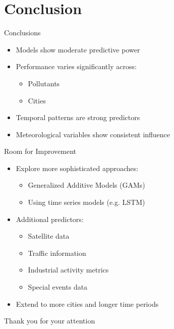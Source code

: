 \documentclass[svgnames, 10pt]{beamer}
\begin{document}
\section{Conclusion}

\begin{frame}{Conclusions}
\begin{itemize}
    \item Models show moderate predictive power
    \item Performance varies significantly across:
        \begin{itemize}
            \item Pollutants
            \item Cities
        \end{itemize}
    \item Temporal patterns are strong predictors
    \item Meteorological variables show consistent influence
\end{itemize}
\end{frame}

\begin{frame}{Room for Improvement}
\begin{itemize}
    \item Explore more sophisticated approaches:
        \begin{itemize}
            \item Generalized Additive Models (GAMs)
            \item Using time series models (e.g. LSTM)
        \end{itemize}
    \item Additional predictors:
        \begin{itemize}
            \item Satellite data
            \item Traffic information
            \item Industrial activity metrics
            \item Special events data
        \end{itemize}
    \item Extend to more cities and longer time periods
\end{itemize}
\end{frame}


\begin{frame}
\begin{center}
\LARGE
\color{mifcolor} Thank you for your attention
\end{center}
\end{frame}
\end{document}
